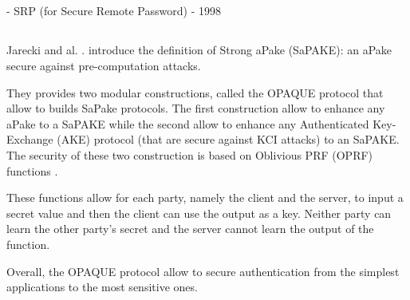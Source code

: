 \documentclass[../report.tex]{subfiles}
\begin{document}



\subsection{}
- SRP (for Secure Remote Password)
- 1998






\subsection{}


\paragraph{}
Jarecki and al. \cite{OPAQUE_Paper}. introduce the definition of Strong aPake (SaPAKE): an aPake secure against pre-computation attacks.

They provides two modular constructions, called the OPAQUE protocol that allow to builds SaPake protocols. The first construction allow to enhance any aPake to a SaPAKE while the second allow to enhance any Authenticated Key-Exchange (AKE) protocol (that are secure against KCI attacks) to an SaPAKE.
The security of these two construction is based on Oblivious PRF (OPRF) functions \cite{}.

These functions allow for each party, namely the client and the server, to input a secret value and then the client can use the output as a key. Neither party can learn the other party's secret and the server cannot learn the output of the function.

Overall, the OPAQUE protocol allow to secure authentication from the simplest applications to the most sensitive ones.


% 
% 
% 
\end{document}
